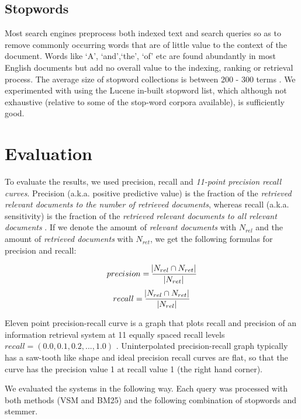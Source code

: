 \subsection{Stopwords}

Most search engines preprocess both indexed text and search queries so as to remove commonly occurring words that are of little value to the context of the document. Words like \lq A', \lq and',\lq the', \lq of' etc are found abundantly in most English documents but add no overall value to the indexing, ranking or retrieval process. The average size of stopword collections is between 200 - 300 terms \citep{manning2008introduction}. We experimented with using the Lucene in-built stopword list, which although not exhaustive (relative to some of the stop-word corpora available), is sufficiently good. 

\section{Evaluation}

To evaluate the results, we used precision, recall and \textit{11-point precision recall curves}. Precision (a.k.a. positive predictive value) is the fraction of the \textit{retrieved relevant documents to the number of retrieved documents}, whereas recall (a.k.a. sensitivity) is the fraction of the \textit{retrieved relevant documents to all relevant documents} \citep{buckland1994relationship}. If we denote the amount of \textit{relevant documents} with $N_{rel}$ and the amount of \textit{retrieved documents} with $ N_{ret} $, we get the following formulas for precision and recall:

\begin{equation}
precision = \frac{ \abs{ N_{rel} \cap N_{ret} } }{\abs{N_{ret}}}
\end{equation}
\begin{equation}
recall = \frac{ \abs{N_{rel} \cap N_{ret} } }{\abs{N_{rel}}}
\end{equation}

Eleven point precision-recall curve is a graph that plots recall and precision of an information retrieval system at 11 equally spaced recall levels $recall = (0.0, 0.1, 0.2,..., 1.0)$ \citep{zhang2009eleven}. Uninterpolated precision-recall graph typically has a saw-tooth like shape and ideal precision recall curves are flat, so that the curve has the precision value 1 at recall value 1 (the right hand corner). 

We evaluated the systems in the following way. Each query was processed with both methods (VSM and BM25) and the following combination of stopwords and stemmer.

